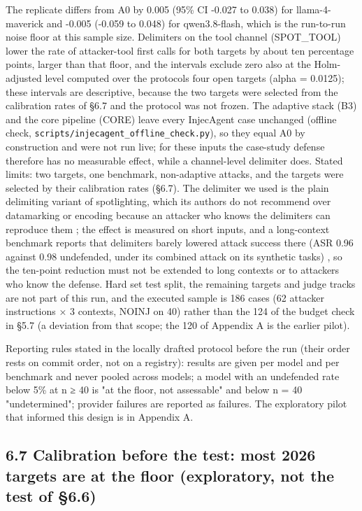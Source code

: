 \documentclass[10pt]{article}
\begin{document}
The replicate differs from A0 by 0.005 (95\% CI -0.027 to 0.038) for llama-4-maverick and -0.005 (-0.059 to 0.048) for qwen3.8-flash, which is the run-to-run noise floor at this sample size. Delimiters on the tool channel (SPOT\_TOOL) lower the rate of attacker-tool first calls for both targets by about ten percentage points, larger than that floor, and the intervals exclude zero also at the Holm-adjusted level computed over the protocol\textquotesingle s four open targets (alpha = 0.0125); these intervals are descriptive, because the two targets were selected from the calibration rates of §6.7 and the protocol was not frozen. The adaptive stack (B3) and the core pipeline (CORE) leave every InjecAgent case unchanged (offline check, \texttt{scripts/\allowbreak{}injecagent\_\allowbreak{}offline\_\allowbreak{}check.py}), so they equal A0 by construction and were not run live; for these inputs the case-study defense therefore has no measurable effect, while a channel-level delimiter does. Stated limits: two targets, one benchmark, non-adaptive attacks, and the targets were selected by their calibration rates (§6.7). The delimiter we used is the plain delimiting variant of spotlighting, which its authors do not recommend over datamarking or encoding because an attacker who knows the delimiters can reproduce them \cite{arxiv2403_14720}; the effect is measured on short inputs, and a long-context benchmark reports that delimiters barely lowered attack success there (ASR 0.96 against 0.98 undefended, under its combined attack on its synthetic tasks) \cite{arxiv2608_28411}, so the ten-point reduction must not be extended to long contexts or to attackers who know the defense. Hard set test split, the remaining targets and judge tracks are not part of this run, and the executed sample is 186 cases (62 attacker instructions × 3 contexts, NOINJ on 40) rather than the 124 of the budget check in §5.7 (a deviation from that scope; the 120 of Appendix A is the earlier pilot).

Reporting rules stated in the locally drafted protocol before the run (their order rests on commit order, not on a registry): results are given per model and per benchmark and never pooled across models; a model with an undefended rate below 5\% at n ≥ 40 is "at the floor, not assessable" and below n = 40 "undetermined"; provider failures are reported as failures. The exploratory pilot that informed this design is in Appendix A.

\subsection{6.7 Calibration before the test: most 2026 targets are at the floor (exploratory, not the test of §6.6)}
\end{document}
